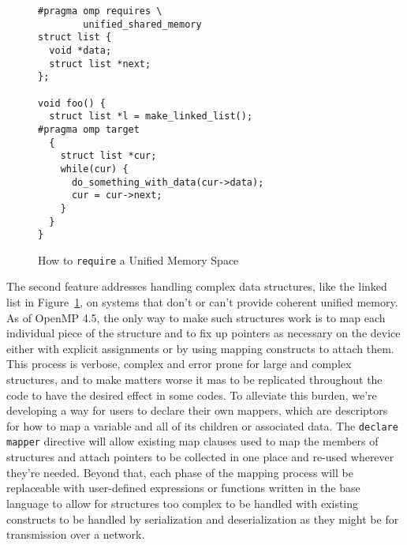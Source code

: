 \begin{figure}
\begin{verbatim}
#pragma omp requires \
        unified_shared_memory
struct list {
  void *data;
  struct list *next;
};

void foo() {
  struct list *l = make_linked_list();
#pragma omp target
  {
    struct list *cur;
    while(cur) {
      do_something_with_data(cur->data);
      cur = cur->next;
    }
  }
}
\end{verbatim}
\caption{How to \texttt{require} a Unified Memory Space}
\label{fig:unified}
\end{figure}

The second feature addresses handling complex data structures, like the linked
list in Figure~\ref{fig:unified}, on systems that don't or can't provide
coherent unified memory.  As of OpenMP 4.5, the only way to make such structures
work is to map each individual piece of the structure and to fix up pointers as
necessary on the device either with explicit assignments or by using mapping
constructs to attach them.  This process is verbose, complex and error prone for
large and complex structures, and to make matters worse it mas to be replicated
throughout the code to have the desired effect in some codes.  To alleviate this
burden, we're developing a way for users to declare their own mappers, which are
descriptors for how to map a variable and all of its children or associated
data.  The \texttt{declare mapper} directive will allow existing map clauses
used to map the members of structures and attach pointers to be collected in
one place and re-used wherever they're needed.  Beyond that, each phase of the
mapping process will be replaceable with user-defined expressions or functions
written in the base language to allow for structures too complex to be handled
with existing constructs to be handled by serialization and deserialization as
they might be for transmission over a network.



